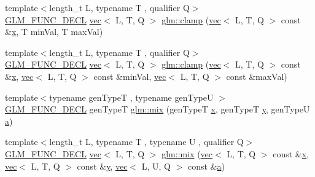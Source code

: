 \begin{DoxyCompactItemize}
\item 
{\footnotesize template$<$length\+\_\+t L, typename T , qualifier Q$>$ }\\\hyperlink{setup_8hpp_ab2d052de21a70539923e9bcbf6e83a51}{G\+L\+M\+\_\+\+F\+U\+N\+C\+\_\+\+D\+E\+CL} \hyperlink{structglm_1_1vec}{vec}$<$ L, T, Q $>$ \hyperlink{group__core__func__common_gabff13e6547edac08f52b4133ff4bf183}{glm\+::clamp} (\hyperlink{structglm_1_1vec}{vec}$<$ L, T, Q $>$ const \&\hyperlink{_s_d_l__opengl_8h_ad0e63d0edcdbd3d79554076bf309fd47}{x}, T min\+Val, T max\+Val)
\item 
{\footnotesize template$<$length\+\_\+t L, typename T , qualifier Q$>$ }\\\hyperlink{setup_8hpp_ab2d052de21a70539923e9bcbf6e83a51}{G\+L\+M\+\_\+\+F\+U\+N\+C\+\_\+\+D\+E\+CL} \hyperlink{structglm_1_1vec}{vec}$<$ L, T, Q $>$ \hyperlink{group__core__func__common_ga748333282a6f2f87762c0a4739c8c364}{glm\+::clamp} (\hyperlink{structglm_1_1vec}{vec}$<$ L, T, Q $>$ const \&\hyperlink{_s_d_l__opengl_8h_ad0e63d0edcdbd3d79554076bf309fd47}{x}, \hyperlink{structglm_1_1vec}{vec}$<$ L, T, Q $>$ const \&min\+Val, \hyperlink{structglm_1_1vec}{vec}$<$ L, T, Q $>$ const \&max\+Val)
\item 
{\footnotesize template$<$typename gen\+TypeT , typename gen\+TypeU $>$ }\\\hyperlink{setup_8hpp_ab2d052de21a70539923e9bcbf6e83a51}{G\+L\+M\+\_\+\+F\+U\+N\+C\+\_\+\+D\+E\+CL} gen\+TypeT \hyperlink{group__core__func__common_ga8e93f374aae27d1a88b921860351f8d4}{glm\+::mix} (gen\+TypeT \hyperlink{_s_d_l__opengl_8h_ad0e63d0edcdbd3d79554076bf309fd47}{x}, gen\+TypeT \hyperlink{_s_d_l__opengl_8h_a1675d9d7bb68e1657ff028643b4037e3}{y}, gen\+TypeU \hyperlink{_s_d_l__opengl__glext_8h_a3309789fc188587d666cda5ece79cf82}{a})
\item 
{\footnotesize template$<$length\+\_\+t L, typename T , typename U , qualifier Q$>$ }\\\hyperlink{setup_8hpp_ab2d052de21a70539923e9bcbf6e83a51}{G\+L\+M\+\_\+\+F\+U\+N\+C\+\_\+\+D\+E\+CL} \hyperlink{structglm_1_1vec}{vec}$<$ L, T, Q $>$ \hyperlink{group__core__func__common_ga2f4d9048be98850541fca540eaad50e9}{glm\+::mix} (\hyperlink{structglm_1_1vec}{vec}$<$ L, T, Q $>$ const \&\hyperlink{_s_d_l__opengl_8h_ad0e63d0edcdbd3d79554076bf309fd47}{x}, \hyperlink{structglm_1_1vec}{vec}$<$ L, T, Q $>$ const \&\hyperlink{_s_d_l__opengl_8h_a1675d9d7bb68e1657ff028643b4037e3}{y}, \hyperlink{structglm_1_1vec}{vec}$<$ L, U, Q $>$ const \&\hyperlink{_s_d_l__opengl__glext_8h_a3309789fc188587d666cda5ece79cf82}{a})
\item 

\end{DoxyCompactItemize}
